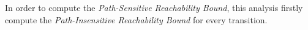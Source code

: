 \subsection{}
\label{sec:alg_rbgen}
%
In order to compute the \emph{Path-Sensitive Reachability Bound}, this analysis firstly compute the \emph{Path-Insensitive Reachability Bound} for every transition.
